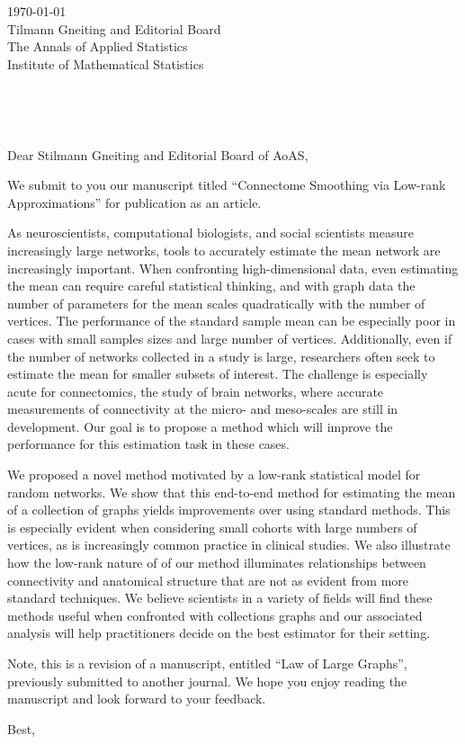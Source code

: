 \documentclass[11pt]{letter} %
\def\opening#1{\thispagestyle{empty}
{\centering\fromaddress \vspace{0.75in} \\ %
} %
{\raggedright \toname \\ \toaddress \par} %
\vspace{0.3in} %
\noindent #1 %
}
\begin{document}
\begin{letter}{%
\today\\
\vspace{11pt}
Tilmann Gneiting and Editorial Board \\
The Annals of Applied Statistics\\
Institute of Mathematical Statistics
}


\opening{Dear Stilmann Gneiting and Editorial Board of AoAS,}

We submit to you our manuscript titled ``Connectome Smoothing via Low-rank Approximations'' for publication as an article.

As neuroscientists, computational biologists, and social scientists measure increasingly large networks, tools to accurately estimate the mean network are increasingly important.
When confronting high-dimensional data, even estimating the mean can require careful statistical thinking, and with graph data the number of parameters for the mean scales quadratically with the number of vertices.
The performance of the standard sample mean can be especially poor in cases with small samples sizes and large number of vertices.
Additionally, even if the number of networks collected in a study is large, researchers often seek to estimate the mean for smaller subsets of interest.
The challenge is especially acute for connectomics, the study of brain networks, where accurate measurements of connectivity at the micro- and meso-scales are still in development.
Our goal is to propose a method which will improve the performance for this estimation task in these cases.

We proposed a novel method motivated by a low-rank statistical model for random networks.
We show that this end-to-end method for estimating the mean of a collection of graphs yields improvements over using standard methods.
This is especially evident when considering small cohorts with large numbers of vertices, as is increasingly common practice in clinical studies.
We also illustrate how the low-rank nature of of our method illuminates relationships between connectivity and anatomical structure that are not as evident from more standard techniques.
We believe scientists in a variety of fields will find these methods useful when confronted with collections graphs and our associated analysis will help practitioners decide on the best estimator for their setting.

Note, this is a revision of a manuscript, entitled ``Law of Large Graphs'', previously submitted to another journal.
We hope you enjoy reading the manuscript and look forward to your feedback.

\closing{Best,}


\end{letter}
\end{document}
